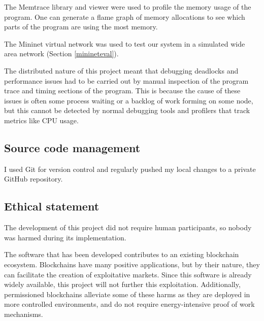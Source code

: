 The Memtrace library and viewer \cite{memtrace} were used to profile the memory usage of the program. One can generate a flame graph of memory allocations to see which parts of the program are using the most memory.

The Mininet virtual network \cite{mininet,lantzNetworkLaptopRapid2010} was used to test our system in a simulated wide area network (Section \ref{minineteval}).

The distributed nature of this project meant that debugging deadlocks and performance issues had to be carried out by manual inspection of the program trace and timing sections of the program. This is because the cause of these issues is often some process waiting or a backlog of work forming on some node, but this cannot be detected by normal debugging tools and profilers that track metrics like CPU usage.

\subsection{Source code management}

I used Git for version control and regularly pushed my local changes to a private GitHub repository.

\subsection{Ethical statement}
The development of this project did not require human participants, so nobody was harmed during its implementation.

The software that has been developed contributes to an existing blockchain ecosystem. Blockchains have many positive applications, but by their nature, they can facilitate the creation of exploitative markets. Since this software is already widely available, this project will not further this exploitation. Additionally, permissioned blockchains alleviate some of these harms as they are deployed in more controlled environments, and do not require energy-intensive proof of work mechanisms.